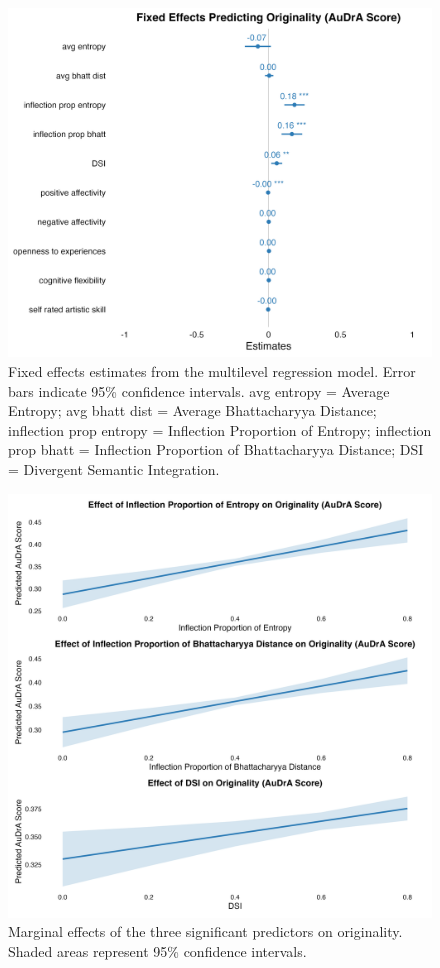 \documentclass[../MA_Thesis.tex]{subfiles}
\begin{document}
\begin{figure}[H]
  \centering
  \includegraphics[width=\textwidth]{../analysis/results/main_results/multilevel_regression/fixed_effects_plott.png}
  \caption{Fixed effects estimates from the multilevel regression model. Error bars indicate 95\% confidence intervals. avg entropy = Average Entropy; avg bhatt dist = Average Bhattacharyya Distance; inflection prop entropy = Inflection Proportion of Entropy; inflection prop bhatt = Inflection Proportion of Bhattacharyya Distance; DSI = Divergent Semantic Integration.}
  \label{fig:coef_plot}
\end{figure}

\begin{figure}[H]
  \centering
  \includegraphics[height=0.9\textheight, width=\textwidth]{../analysis/results/main_results/multilevel_regression/marginal_effects_plot.png}
  \caption{Marginal effects of the three significant predictors on originality. Shaded areas represent 95\% confidence intervals.}
  \label{fig:marginal_plot}
\end{figure}
\end{document}
